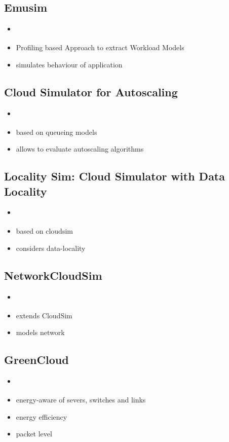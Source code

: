 \subsection{Emusim}
\begin{itemize}
	\item \cite{emusim}
	\item Profiling based Approach to extract Workload Models
	\item simulates behaviour of application
\end{itemize}

\subsection{Cloud Simulator for Autoscaling}
\begin{itemize}
	\item \cite{autoscale_cloud}
	\item based on queueing models
	\item allows to evaluate autoscaling algorithms
\end{itemize}

\subsection{Locality Sim: Cloud Simulator with Data Locality}
\begin{itemize}
	\item \cite{localitysim}
	\item based on cloudsim
	\item considers data-locality
\end{itemize}

\subsection{NetworkCloudSim}
\begin{itemize}
	\item \cite{networkcloudsim}
	\item extends CloudSim
	\item models network
\end{itemize}


\subsection{GreenCloud}
\begin{itemize}
	\item \cite{green_cloud}
	\item energy-aware of severs, switches and links
	\item energy efficiency
	\item packet level
\end{itemize}

